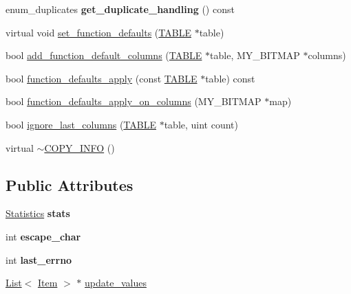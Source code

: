 \begin{DoxyCompactItemize}
\mbox{\label{classCOPY__INFO_a74c1de9324e8774de5dcbedace0ed357}} 
enum\+\_\+duplicates {\bfseries get\+\_\+duplicate\+\_\+handling} () const
\item 
virtual void \mbox{\hyperlink{classCOPY__INFO_a7ce8622f7a089c3b7ad02858539899ba}{set\+\_\+function\+\_\+defaults}} (\mbox{\hyperlink{structTABLE}{T\+A\+B\+LE}} $\ast$table)
\item 
bool \mbox{\hyperlink{classCOPY__INFO_ae3d8192214b05dc110801ec8dd999edc}{add\+\_\+function\+\_\+default\+\_\+columns}} (\mbox{\hyperlink{structTABLE}{T\+A\+B\+LE}} $\ast$table, M\+Y\+\_\+\+B\+I\+T\+M\+AP $\ast$columns)
\item 
bool \mbox{\hyperlink{classCOPY__INFO_ac7e53a23c1bafc7c6e32d32091c957eb}{function\+\_\+defaults\+\_\+apply}} (const \mbox{\hyperlink{structTABLE}{T\+A\+B\+LE}} $\ast$table) const
\item 
bool \mbox{\hyperlink{classCOPY__INFO_af9bd54cdb4f21814f6575129550313aa}{function\+\_\+defaults\+\_\+apply\+\_\+on\+\_\+columns}} (M\+Y\+\_\+\+B\+I\+T\+M\+AP $\ast$map)
\item 
bool \mbox{\hyperlink{classCOPY__INFO_a76b958b97160409b58f5ca669014e732}{ignore\+\_\+last\+\_\+columns}} (\mbox{\hyperlink{structTABLE}{T\+A\+B\+LE}} $\ast$table, uint count)
\item 
virtual \mbox{\hyperlink{classCOPY__INFO_a0489e263f2e297822a61946ea98a9dc4}{$\sim$\+C\+O\+P\+Y\+\_\+\+I\+N\+FO}} ()
\end{DoxyCompactItemize}
\subsection*{Public Attributes}
\begin{DoxyCompactItemize}
\item 
\mbox{\label{classCOPY__INFO_a2a8ecb111b8337d5fa22c18767568fc1}} 
\mbox{\hyperlink{classCOPY__INFO_1_1Statistics}{Statistics}} {\bfseries stats}
\item 
\mbox{\label{classCOPY__INFO_a75823e55a0adcff9b6ea4b1e25f14ec9}} 
int {\bfseries escape\+\_\+char}
\item 
\mbox{\label{classCOPY__INFO_ad7ef0c76f46e39ab43aecc6d3898ea44}} 
int {\bfseries last\+\_\+errno}
\item 
\mbox{\hyperlink{classList}{List}}$<$ \mbox{\hyperlink{classItem}{Item}} $>$ $\ast$ \mbox{\hyperlink{classCOPY__INFO_a451057d07720b1c973ac2881c8939406}{update\+\_\+values}}
\end{DoxyCompactItemize}
